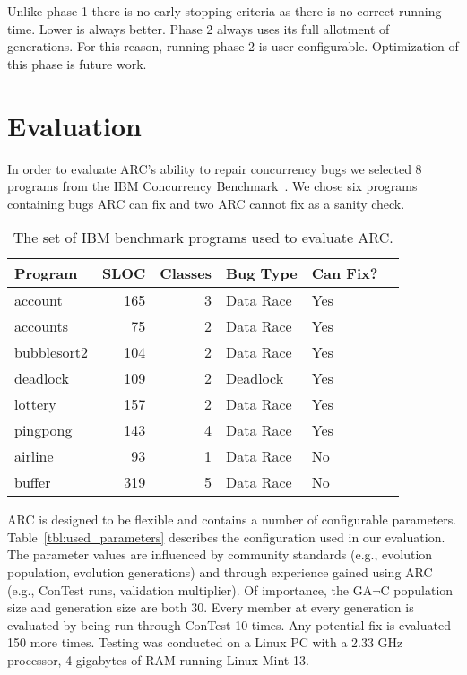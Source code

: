 \documentclass[runningheads,a4paper]{llncs}
\begin{document}
Unlike phase 1 there is no early stopping criteria as there is no correct running time.  Lower is always better.  Phase 2 always uses its full allotment of generations. For this reason, running phase 2 is user-configurable.  Optimization of this phase is future work.

\section{Evaluation}
\label{sec:experiments}

In order to evaluate ARC's ability to repair concurrency bugs we selected 8 programs from the IBM Concurrency Benchmark~\cite{HSU03, EU04, ETU08}. We chose six programs containing bugs ARC can fix and two ARC cannot fix as a sanity check.

\begin{table}[!t]
\caption{The set of IBM benchmark programs used to evaluate ARC.}
\begin{center}
\begin{tabular}{|l|r|r|l|l|p{4.5cm}|}
\hline
\textbf{Program} & \textbf{SLOC} & \textbf{Classes} & \textbf{Bug Type} & \textbf{Can Fix?}\\
\hline
account & 165 & 3 & Data Race & Yes\\
\hline
accounts & 75 & 2 & Data Race & Yes\\
\hline
bubblesort2 & 104 & 2 & Data Race & Yes\\
\hline

deadlock & 109 & 2 & Deadlock & Yes\\
\hline
lottery & 157 & 2 & Data Race & Yes\\
\hline
pingpong & 143 & 4 & Data Race & Yes\\
\hline
airline & 93 & 1 & Data Race & No\\
\hline
buffer & 319 & 5 & Data Race & No\\
\hline
\end{tabular}
\label{tbl:used_programs}
\end{center}
\end{table}

ARC is designed to be flexible and contains a number of configurable parameters. Table~\ref{tbl:used_parameters} describes the configuration used in our evaluation. The parameter values are influenced by community standards (e.g., evolution population, evolution generations) and through experience gained using ARC (e.g., ConTest runs, validation multiplier). Of importance, the GA$\neg$C population size and generation size are both 30.  Every member at every generation is evaluated by being run through ConTest 10 times.  Any potential fix is evaluated 150 more times. Testing was conducted on a Linux PC with a 2.33 GHz processor, 4 gigabytes of RAM running Linux Mint 13.
\end{document}
